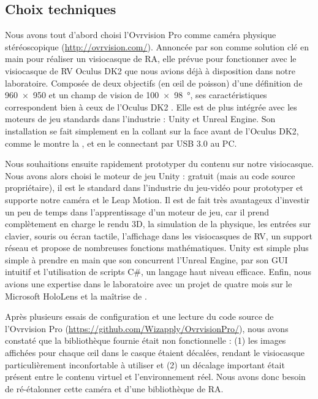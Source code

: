 \subsection{Choix techniques}
\label{subsec:technical_choices}
Nous avons tout d'abord choisi l'Ovrvision Pro comme caméra physique stéréoscopique (\url{http://ovrvision.com/}). Annoncée par son comme solution clé en main pour réaliser un visiocasque de RA, elle prévue pour fonctionner avec le visiocasque de RV Oculus DK2 que nous avions déjà à disposition dans notre laboratoire. Composée de deux objectifs  (en \oe il de poisson) d'une définition de \SI{960x950}{\px} et un champ de vision de \SI{100x98}{\degree}, ses caractéristiques correspondent bien à ceux de l'Oculus DK2 . Elle est de plus intégrée avec les moteurs de jeu standards dans l'industrie : Unity et Unreal Engine. Son installation se fait simplement en la collant sur la face avant de l'Oculus DK2, comme le montre la , et en le connectant par USB 3.0 au PC.


Nous souhaitions ensuite rapidement prototyper du contenu sur notre visiocasque. Nous avons alors choisi le moteur de jeu Unity : gratuit (mais au code source propriétaire), il est le standard dans l'industrie du jeu-vidéo pour prototyper et supporte notre caméra et le Leap Motion. Il est de fait très avantageux d'investir un peu de temps dans l'apprentissage d'un moteur de jeu, car il prend complètement en charge le rendu 3D, la simulation de la physique, les entrées sur clavier, souris ou écran tactile, l'affichage dans les visiocasques de RV, un support réseau et propose de nombreuses fonctions mathématiques. Unity est simple plus simple à prendre en main que son concurrent l'Unreal Engine, par son GUI intuitif et l'utilisation de scripts C\#, un langage haut niveau efficace. Enfin, nous avions une expertise dans le laboratoire avec un projet de quatre mois sur le Microsoft HoloLens et la maîtrise de \cite{Millette2016}.

Après plusieurs essais de configuration et une lecture du code source de l'Ovrvision Pro (\url{https://github.com/Wizapply/OvrvisionPro/}), nous avons constaté que la bibliothèque fournie était non fonctionnelle : (1) les images affichées pour chaque \oe il dans le casque étaient décalées, rendant le visiocasque particulièrement inconfortable à utiliser et (2) un décalage important était présent entre le contenu virtuel et l'environnement réel. Nous avons donc besoin de ré-étalonner cette caméra et d'une bibliothèque de RA.

